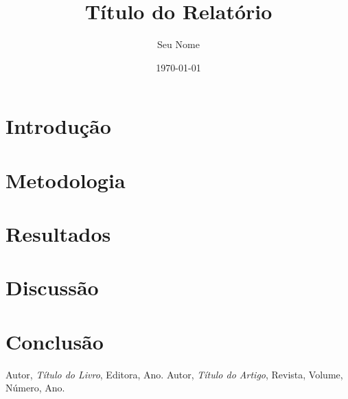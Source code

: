 \documentclass[a4paper,12pt]{report}
\title{Título do Relatório}
\author{Seu Nome}
\date{\today}
\begin{document}
\maketitle
\tableofcontents
\newpage

\chapter{Introdução}
\lipsum[2-3]

\chapter{Metodologia}
\lipsum[4-5]

\chapter{Resultados}
\lipsum[6-7]

\chapter{Discussão}
\lipsum[8-9]

\chapter{Conclusão}
\lipsum[10]

\begin{thebibliography}{9}
 Autor, \textit{Título do Livro}, Editora, Ano.
 Autor, \textit{Título do Artigo}, Revista, Volume, Número, Ano.
\end{thebibliography}
\end{document}
